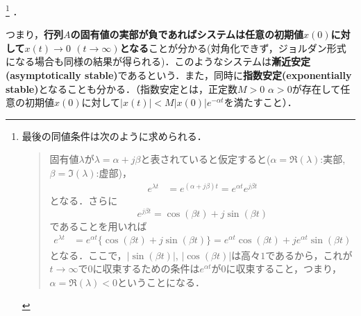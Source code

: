\footnote{
最後の同値条件は次のように求められる．
\begin{quote}
固有値$\lambda$が$\lambda = \alpha + j \beta$と表されていると仮定すると($\alpha = \Re(\lambda)$:実部, $\beta = \Im(\lambda)$:虚部)，
\begin{align*}
 e^{{\lambda} t} &= e^{(\alpha + j \beta)t} = e^{\alpha t}e^{j \beta t}
\end{align*}
となる．さらに
\begin{equation*}
 e^{j \beta t} = \cos(\beta t) + j \sin(\beta t)
\end{equation*}
であることを用いれば
\begin{align*}
 e^{{\lambda} t}  &= e^{\alpha t} \{ \cos(\beta t) + j \sin(\beta t) \} 
	= e^{\alpha t} \cos(\beta t)  + j e^{\alpha t} \sin(\beta t)
\end{align*}
となる．ここで，$|\sin(\beta t)|$, $|\cos(\beta t)|$は高々$1$であるから，これが$t \rightarrow \infty$で$0$に収束するための条件は$e^{{\alpha} t}$が$0$に収束すること，つまり，$\alpha = \Re(\lambda)<0$ということになる．
\end{quote}
}
．


つまり，{\bf 行列$A$の固有値の実部が負であればシステムは任意の初期値$x(0)$に対して$x(t) \rightarrow 0$ $(t \rightarrow \infty)$となる}ことが分かる(対角化できず，ジョルダン形式になる場合も同様の結果が得られる)．このようなシステムは{\bf 漸近安定(asymptotically stable)}であるという．また，同時に{\bf 指数安定(exponentially stable)}となることも分かる．（指数安定とは，正定数$M>0$ $\alpha>0$が存在して任意の初期値$x(0)$に対して$|x(t)| < M |x(0)| e^{-\alpha t}$を満たすこと）．

